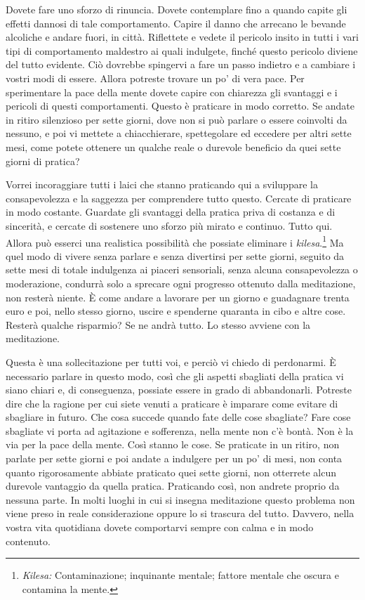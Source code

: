 Dovete fare uno sforzo di rinuncia. Dovete contemplare fino a quando
capite gli effetti dannosi di tale comportamento. Capire il danno che
arrecano le bevande alcoliche e andare fuori, in città. Riflettete e
vedete il pericolo insito in tutti i vari tipi di comportamento
maldestro ai quali indulgete, finché questo pericolo diviene del tutto
evidente. Ciò dovrebbe spingervi a fare un passo indietro e a cambiare i
vostri modi di essere. Allora potreste trovare un po' di vera pace. Per
sperimentare la pace della mente dovete capire con chiarezza gli
svantaggi e i pericoli di questi comportamenti. Questo è praticare in
modo corretto. Se andate in ritiro silenzioso per sette giorni, dove non
si può parlare o essere coinvolti da nessuno, e poi vi mettete a
chiacchierare, spettegolare ed eccedere per altri sette mesi, come
potete ottenere un qualche reale o durevole beneficio da quei sette
giorni di pratica?

Vorrei incoraggiare tutti i laici che stanno praticando qui a sviluppare
la consapevolezza e la saggezza per comprendere tutto questo. Cercate di
praticare in modo costante. Guardate gli svantaggi della pratica priva
di costanza e di sincerità, e cercate di sostenere uno sforzo più mirato
e continuo. Tutto qui. Allora può esserci una realistica possibilità che
possiate eliminare i \emph{kilesa}.\footnote{\emph{Kilesa:}
  Contaminazione; inquinante mentale; fattore mentale che oscura e
  contamina la mente.} Ma quel modo di vivere senza parlare e senza
divertirsi per sette giorni, seguito da sette mesi di totale indulgenza
ai piaceri sensoriali, senza alcuna consapevolezza o moderazione,
condurrà solo a sprecare ogni progresso ottenuto dalla meditazione, non
resterà niente. È come andare a lavorare per un giorno e guadagnare
trenta euro e poi, nello stesso giorno, uscire e spenderne quaranta in
cibo e altre cose. Resterà qualche risparmio? Se ne andrà tutto. Lo
stesso avviene con la meditazione.

Questa è una sollecitazione per tutti voi, e perciò vi chiedo di
perdonarmi. È necessario parlare in questo modo, così che gli aspetti
sbagliati della pratica vi siano chiari e, di conseguenza, possiate
essere in grado di abbandonarli. Potreste dire che la ragione per cui
siete venuti a praticare è imparare come evitare di sbagliare in futuro.
Che cosa succede quando fate delle cose sbagliate? Fare cose sbagliate
vi porta ad agitazione e sofferenza, nella mente non c'è bontà. Non è la
via per la pace della mente. Così stanno le cose. Se praticate in un
ritiro, non parlate per sette giorni e poi andate a indulgere per un po'
di mesi, non conta quanto rigorosamente abbiate praticato quei sette
giorni, non otterrete alcun durevole vantaggio da quella pratica.
Praticando così, non andrete proprio da nessuna parte. In molti luoghi
in cui si insegna meditazione questo problema non viene preso in reale
considerazione oppure lo si trascura del tutto. Davvero, nella vostra
vita quotidiana dovete comportarvi sempre con calma e in modo contenuto.

